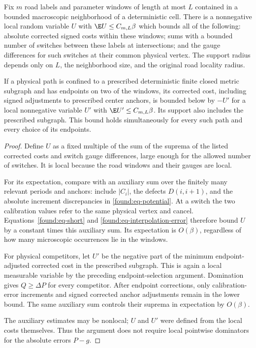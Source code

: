 \begin{lemma}
\label{found:lem-envelope}
Fix $m$ road labels and parameter windows of length at most $L$ contained
in a bounded macroscopic neighborhood of a deterministic cell.  There
is a nonnegative local random variable $U$ with
$\E U\leq C_{m,L}\beta$ which bounds all of the following:
absolute corrected signed costs within these windows; sums with a
bounded number of switches between these labels at intersections; and
the gauge differences for such switches at their common physical
vertex.  The support radius depends only on $L$, the
neighborhood size, and the original road locality radius.

If a physical path is confined to a prescribed deterministic finite
closed metric subgraph and has endpoints on two of the windows,
its corrected cost, including signed adjustments to prescribed center
anchors, is bounded below by $-U'$ for a local nonnegative variable
$U'$ with $\E U'\leq C_{m,L}\beta$.  Its support also includes
the prescribed subgraph.  This bound holds simultaneously for every such
path and every choice of its endpoints.
\end{lemma}

\begin{proof}
Define $U$ as a fixed multiple of the sum of the suprema of the listed
corrected costs and switch gauge differences, large enough for the
allowed number of switches.  It is local because the road windows
and their gauges are local.

For its expectation, compare with an auxiliary sum over the finitely
many relevant periods and anchors: include $|C_i|$, the defects
$D(i,i+1)$, and the absolute increment discrepancies in
\eqref{found:eq-potential}.  At a switch the two calibration values
refer to the same physical vertex and cancel.
Equations~\eqref{found:eq-short} and
\eqref{found:eq-interpolation-error} therefore bound $U$ by a constant
times this auxiliary sum.  Its expectation is $O(\beta)$, regardless
of how many microscopic occurrences lie in the windows.

For physical competitors, let $U'$ be the negative part of the minimum
endpoint-adjusted corrected cost in the prescribed subgraph.  This is
again a local measurable variable by the preceding endpoint-selection
argument. Domination gives $Q\ge\Delta P$ for
every competitor.  After endpoint corrections, only calibration-error
increments and signed corrected anchor adjustments remain in the
lower bound.  The same auxiliary sum controls their suprema in
expectation by $O(\beta)$.

The auxiliary estimates may be nonlocal; $U$ and $U'$ were defined
from the local costs themselves.  Thus the argument does not require
local pointwise dominators for the absolute errors $P-g$.
\end{proof}

